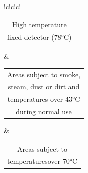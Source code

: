 \documentclass[12pt,fleqn]{book} %
\begin{document}
\begin{enumerate}
\begin{itemize}
\begin{table}[h]
\begin{tabular}{!{\color[rgb]{0.584,0.702,0.843}\vrule}c!{\color{black}\vrule}c!{\color[rgb]{0.584,0.702,0.843}\vrule}c!{\color[rgb]{0.584,0.702,0.843}\vrule}}
\hline
{} \begin{tabular}[c]{@{}>{\cellcolor[rgb]{0.859,0.898,0.945}}c@{}}High temperature\\fixed detector (78°C)\end{tabular} & \begin{tabular}[c]{@{}>{\cellcolor[rgb]{0.859,0.898,0.945}}c@{}}Areas subject to smoke,\\steam, dust or dirt and\\temperatures over 43°C\\during normal use\end{tabular} & \begin{tabular}[c]{@{}>{\cellcolor[rgb]{0.859,0.898,0.945}}c@{}}Areas subject to\\temperaturesover 70°C\end{tabular}                                   \\
\hline
\end{tabular}
\end{table}


\end{itemize}
\end{enumerate}
\end{document}
